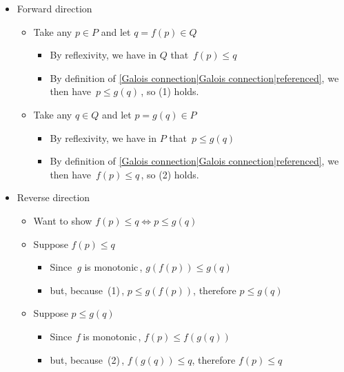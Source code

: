 \begin{itemize}
    \item Forward direction
          \begin{itemize}
            \item Take any $p \in P$ and let $q = f(p) \in Q$
                  \begin{itemize}
                    \item By reflexivity, we have in $Q$ that \,$f(p) \leq q$\,
                    \item By definition of \ref{Galois connection|Galois connection|referenced}, we then have \,$p \leq g(q)$\,, so (1) holds.
                  \end{itemize}
            \item Take any $q \in Q$ and let $p = g(q) \in P$
                  \begin{itemize}
                    \item By reflexivity, we have in $P$ that \,$p \leq g(q)$\,
                    \item By definition of \ref{Galois connection|Galois connection|referenced}, we then have \,$f(p) \leq q$\,, so (2) holds.
                  \end{itemize}
          \end{itemize}

    \item Reverse direction
          \begin{itemize}
            \item Want to show $f(p)\leq q \iff p \leq g(q)$
            \item Suppose $f(p) \leq q$
                  \begin{itemize}
                    \item Since \,\emph{g} is monotonic\,, $g(f(p)) \leq g(q)$
                    \item but, because \,(1)\,, $p \leq g(f(p))$, therefore $p \leq g(q)$
                  \end{itemize}
            \item Suppose $p \leq g(q)$
                  \begin{itemize}
                    \item Since \,\emph{f} is monotonic\,, $f(p) \leq f(g(q))$
                    \item but, because \,(2)\,, $f(g(q)) \leq q$, therefore $f(p) \leq q$\end{itemize}
          \end{itemize}
  \end{itemize}